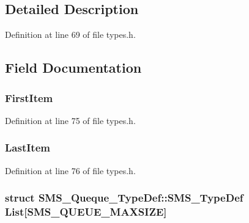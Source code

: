\subsection{Detailed Description}


Definition at line 69 of file types.\+h.



\subsection{Field Documentation}
\hypertarget{struct_s_m_s___queque___type_def_a02e3816c48764fe1b9db7b5944f3e72f}{}
\subsubsection[{First\+Item}]{ First\+Item}\label{struct_s_m_s___queque___type_def_a02e3816c48764fe1b9db7b5944f3e72f}


Definition at line 75 of file types.\+h.

\hypertarget{struct_s_m_s___queque___type_def_ac709f50bfbbb3c69a54b858b3ae7423d}{}
\subsubsection[{Last\+Item}]{ Last\+Item}\label{struct_s_m_s___queque___type_def_ac709f50bfbbb3c69a54b858b3ae7423d}


Definition at line 76 of file types.\+h.

\hypertarget{struct_s_m_s___queque___type_def_ab41a6d7526c94d7ba28a72e2f37aabf8}{}
\subsubsection[{List}]{\setlength{\rightskip}{0pt plus 5cm}struct {\bf S\+M\+S\+\_\+\+Queque\+\_\+\+Type\+Def\+::\+S\+M\+S\+\_\+\+Type\+Def} List\mbox{[}{\bf S\+M\+S\+\_\+\+Q\+U\+E\+U\+E\+\_\+\+M\+A\+X\+S\+I\+Z\+E}\mbox{]}}\label{struct_s_m_s___queque___type_def_ab41a6d7526c94d7ba28a72e2f37aabf8}
\hypertarget{struct_s_m_s___queque___type_def_a84d6da72470ad7fca2b7482887203f3e}{}
